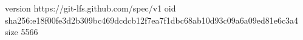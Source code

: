 version https://git-lfs.github.com/spec/v1
oid sha256:e18f00fe3d2b309bc469dcdcb12f7ea7f1dbc68ab10d93c09a6a09ed81e6c3a4
size 5566
